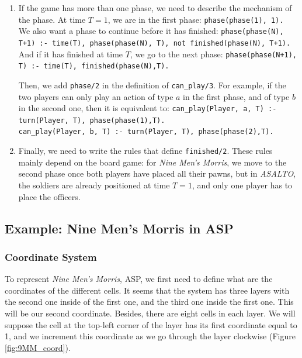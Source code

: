 \begin{enumerate}
\item If the game has more than one phase, we need to describe the mechanism of the phase. At time $T=1$, we are in the first phase:\newline
\texttt{phase(phase(1), 1).}\\
We also want a phase to continue before it has finished:\newline
\texttt{phase(phase(N), T+1) :- time(T), phase(phase(N), T), not finished(phase(N), T+1).}\\
And if it has finished at time $T$, we go to the next phase:\newline
\texttt{phase(phase(N+1), T) :- time(T), finished(phase(N),T).}

\smallskip

Then, we add \texttt{phase/2} in the definition of \texttt{can\_play/3}. For example, if the two players can only play an action of type $a$ in the first phase, and of type $b$ in the second one, then it is equivalent to: \newline
\texttt{can\_play(Player, a, T) :- turn(Player, T), phase(phase(1),T).}\\
\texttt{can\_play(Player, b, T) :- turn(Player, T), phase(phase(2),T).}

\item Finally, we need to write the rules that define \texttt{finished/2}. These rules mainly depend on the board game: for \textit{Nine Men's Morris}, we move to the second phase once both players have placed all their pawns, but in \textit{ASALTO}, the soldiers are already positioned at time $T=1$, and only one player has to place the officers. 
\end{enumerate}

\subsection{Example: Nine Men's Morris in ASP}

\subsubsection{Coordinate System}

To represent \textit{Nine Men's Morris}, ASP, we first need to define what are the coordinates of the different cells. It seems that the system has three layers with the second one inside of the first one, and the third one inside the first one. This will be our second coordinate. Besides, there are eight cells in each layer. We will suppose the cell at the top-left corner of the layer has its first coordinate equal to 1, and we increment this coordinate as we go through the layer clockwise (Figure \ref{fig:9MM_coord}).

